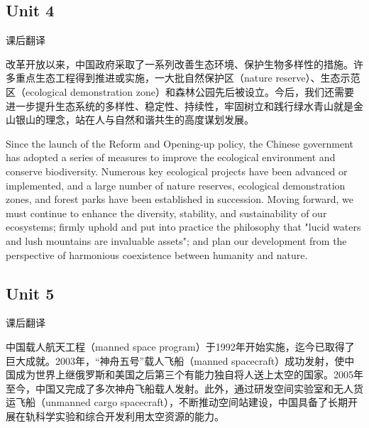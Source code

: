 \subsection{Unit 4}
\begin{question}{课后翻译}
	
改革开放以来，中国政府采取了一系列改善生态环境、保护生物多样性的措施。许多重点生态工程得到推进或实施，一大批自然保护区（nature reserve）、生态示范区（ecological demonstration zone）和森林公园先后被设立。今后，我们还需要进一步提升生态系统的多样性、稳定性、持续性，牢固树立和践行绿水青山就是金山银山的理念，站在人与自然和谐共生的高度谋划发展。
	
\end{question}

\begin{solution}
	
Since the launch of the Reform and Opening-up policy, the Chinese government has adopted a series of measures to improve the ecological environment and conserve biodiversity. Numerous key ecological projects have been advanced or implemented, and a large number of nature reserves, ecological demonstration zones, and forest parks have been established in succession. Moving forward, we must continue to enhance the diversity, stability, and sustainability of our ecosystems; firmly uphold and put into practice the philosophy that "lucid waters and lush mountains are invaluable assets"; and plan our development from the perspective of harmonious coexistence between humanity and nature.
\end{solution}

\subsection{Unit 5}

\begin{question}{课后翻译}
	
中国载人航天工程（manned space program）于1992年开始实施，迄今已取得了巨大成就。2003年，“神舟五号”载人飞船（manned spacecraft）成功发射，使中国成为世界上继俄罗斯和美国之后第三个有能力独自将人送上太空的国家。2005年至今，中国又完成了多次神舟飞船载人发射。此外，通过研发空间实验室和无人货运飞船（unmanned cargo spacecraft），不断推动空间站建设，中国具备了长期开展在轨科学实验和综合开发利用太空资源的能力。
	
\end{question}

